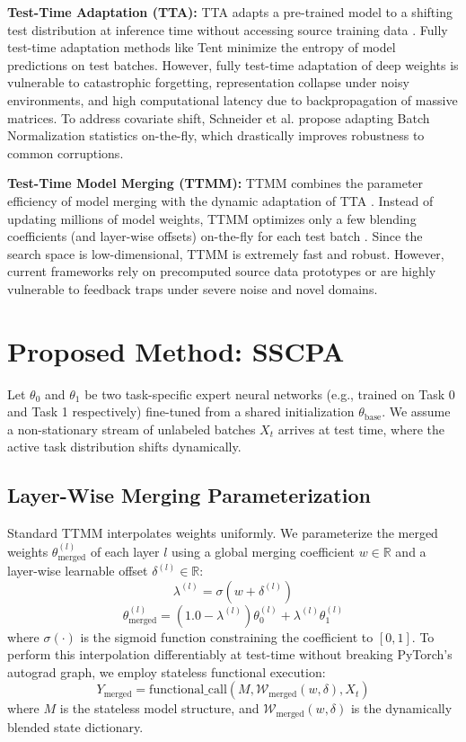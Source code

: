 \documentclass{article}
\theoremstyle{plain}
\theoremstyle{definition}
\theoremstyle{remark}
\begin{document}
\textbf{Test-Time Adaptation (TTA):} TTA adapts a pre-trained model to a shifting test distribution at inference time without accessing source training data \cite{wang21}. Fully test-time adaptation methods like Tent \cite{wang21} minimize the entropy of model predictions on test batches. However, fully test-time adaptation of deep weights is vulnerable to catastrophic forgetting, representation collapse under noisy environments, and high computational latency due to backpropagation of massive matrices. To address covariate shift, Schneider et al. \cite{schneider20} propose adapting Batch Normalization statistics on-the-fly, which drastically improves robustness to common corruptions.

\textbf{Test-Time Model Merging (TTMM):} TTMM combines the parameter efficiency of model merging with the dynamic adaptation of TTA \cite{yang24}. Instead of updating millions of model weights, TTMM optimizes only a few blending coefficients (and layer-wise offsets) on-the-fly for each test batch \cite{hubotter26}. Since the search space is low-dimensional, TTMM is extremely fast and robust. However, current frameworks rely on precomputed source data prototypes or are highly vulnerable to feedback traps under severe noise and novel domains.

\section{Proposed Method: SSCPA}
\label{sec:method}
Let $\theta_0$ and $\theta_1$ be two task-specific expert neural networks (e.g., trained on Task 0 and Task 1 respectively) fine-tuned from a shared initialization $\theta_{\text{base}}$. We assume a non-stationary stream of unlabeled batches $X_t$ arrives at test time, where the active task distribution shifts dynamically.

\subsection{Layer-Wise Merging Parameterization}
Standard TTMM interpolates weights uniformly. We parameterize the merged weights $\theta_{\text{merged}}^{(l)}$ of each layer $l$ using a global merging coefficient $w \in \mathbb{R}$ and a layer-wise learnable offset $\delta^{(l)} \in \mathbb{R}$:
\begin{equation}
    \lambda^{(l)} = \sigma(w + \delta^{(l)})
\end{equation}
\begin{equation}
    \theta_{\text{merged}}^{(l)} = (1.0 - \lambda^{(l)}) \theta_0^{(l)} + \lambda^{(l)} \theta_1^{(l)}
\end{equation}
where $\sigma(\cdot)$ is the sigmoid function constraining the coefficient to $[0, 1]$. To perform this interpolation differentiably at test-time without breaking PyTorch's autograd graph, we employ stateless functional execution:
\begin{equation}
    Y_{\text{merged}} = \text{functional\_call}(M, \mathcal{W}_{\text{merged}}(w, \delta), X_t)
\end{equation}
where $M$ is the stateless model structure, and $\mathcal{W}_{\text{merged}}(w, \delta)$ is the dynamically blended state dictionary.
\end{document}
